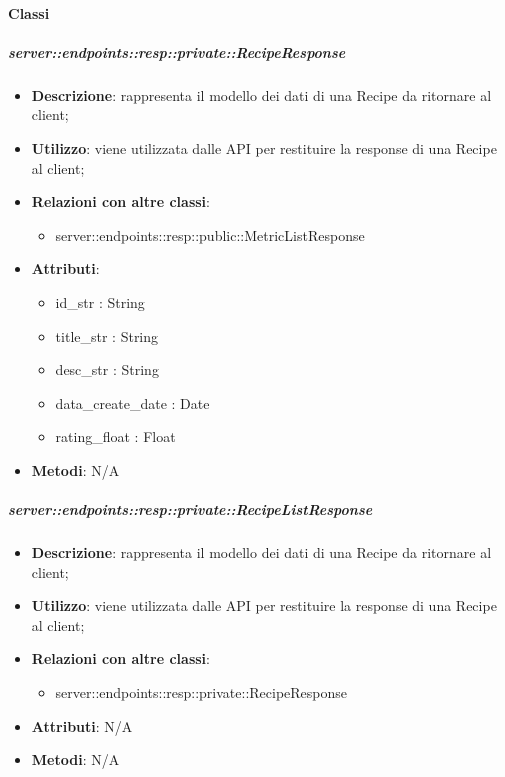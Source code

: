 	\paragraph{Classi} %

    \subparagraph{server::endpoints::resp::private::RecipeResponse} %
    \label{subp:bdsm_app_server_endpoints_resp_private_reciperesponse}
    \begin{itemize}
      \item \textbf{Descrizione}: rappresenta il modello dei dati di una Recipe da ritornare al client;
      \item \textbf{Utilizzo}: viene utilizzata dalle API per restituire la response di una Recipe al client;
      \item \textbf{Relazioni con altre classi}:
        \begin{itemize}
  			\item server::endpoints::resp::public::MetricListResponse
		\end{itemize}
	  \item \textbf{Attributi}:  
	  	\begin{itemize}
	  		\item id\_str : String
	  		\item title\_str : String
	  		\item desc\_str : String
	  		\item data\_create\_date : Date
	  		\item rating\_float : Float
	  	\end{itemize}
	  \item \textbf{Metodi}: N/A
      \end{itemize}

    \subparagraph{server::endpoints::resp::private::RecipeListResponse} %
    \label{subp:bdsm_app_server_endpoints_resp_private_recipelistresponse}
    \begin{itemize}
      \item \textbf{Descrizione}: rappresenta il modello dei dati di una Recipe da ritornare al client;
      \item \textbf{Utilizzo}: viene utilizzata dalle API per restituire la response di una Recipe al client;
      \item \textbf{Relazioni con altre classi}:
        \begin{itemize}
          \item server::endpoints::resp::private::RecipeResponse
        \end{itemize}
	  \item \textbf{Attributi}: N/A
	  \item \textbf{Metodi}: N/A
      \end{itemize}

